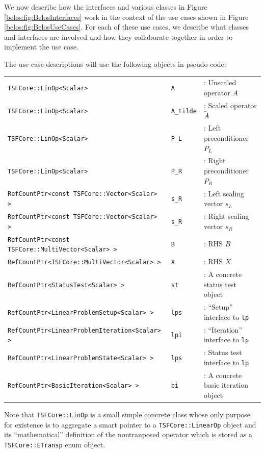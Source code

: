 \documentclass[pdf,ps2pdf,11pt]{SANDreport}
\begin{document}
We now describe how the interfaces and various classes in Figure
{}\ref{belos:fig:BelosInterfaces} work in the context of the use cases
shown in Figure {}\ref{belos:fig:BelosUseCases}.  For each of these
use cases, we describe what classes and interfaces are involved and
how they collaborate together in order to implement the use case.

The use case descriptions will use the following objects in
pseudo-code:

\begin{tabular}{lll}
{\small\texttt{TSFCore::LinOp<Scalar>}} & {\small\texttt{A}} & : Unscaled operator $A$ \\
{\small\texttt{TSFCore::LinOp<Scalar>}} & {\small\texttt{A\_tilde}} & : Scaled operator $\tilde{A}$ \\
{\small\texttt{TSFCore::LinOp<Scalar>}} & {\small\texttt{P\_L}} & : Left preconditioner $P_L$ \\
{\small\texttt{TSFCore::LinOp<Scalar>}} & {\small\texttt{P\_R}} & : Right preconditioner $P_R$ \\
{\small\texttt{RefCountPtr<const TSFCore::Vector<Scalar> >}} & {\small\texttt{s\_R}} & : Left scaling vector $s_L$ \\
{\small\texttt{RefCountPtr<const TSFCore::Vector<Scalar> >}} & {\small\texttt{s\_R}} & : Right scaling vector $s_R$ \\
{\small\texttt{RefCountPtr<const TSFCore::MultiVector<Scalar> >}} & {\small\texttt{B}} & : RHS $B$ \\
{\small\texttt{RefCountPtr<TSFCore::MultiVector<Scalar> >}} & {\small\texttt{X}} & : RHS $X$ \\
{\small\texttt{RefCountPtr<StatusTest<Scalar> >}} & {\small\texttt{st}} & : A concrete status test object  \\
{\small\texttt{RefCountPtr<LinearProblemSetup<Scalar> >}} & {\small\texttt{lps}} & : ``Setup'' interface to {}\texttt{lp} \\
{\small\texttt{RefCountPtr<LinearProblemIteration<Scalar> >}} & {\small\texttt{lpi}} & : ``Iteration'' interface to  {}\texttt{lp} \\
{\small\texttt{RefCountPtr<LinearProblemState<Scalar> >}} & {\small\texttt{lps}} & : Status test interface to  {}\texttt{lp} \\
{\small\texttt{RefCountPtr<BasicIteration<Scalar> >}} & {\small\texttt{bi}} & : A concrete basic iteration object
\end{tabular}

Note that {}\texttt{TSFCore::\-LinOp} is a small simple concrete class
whose only purpose for existence is to aggregate a smart pointer to a
{}\texttt{TSFCore::\-Linear\-Op} object and its ``mathematical''
definition of the nontranposed operator which is stored as a
{}\texttt{TSFCore::\-ETransp} enum object.
\end{document}
